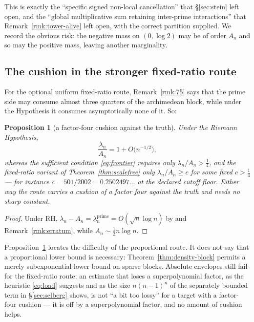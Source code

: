 \documentclass[11pt]{amsart}
\newtheorem{proposition}[theorem]{Proposition}
\theoremstyle{definition}
\theoremstyle{remark}
\theoremstyle{definition}
\begin{document}
This is exactly the ``specific signed non-local cancellation'' that \S\ref{sec:stein} left open, and
the ``global multiplicative sum retaining inter-prime interactions'' that
Remark~\ref{rmk:tower-alive} left open, with the correct partition supplied. We record the obvious
risk: the negative mass on $(0,\log2)$ may be of order $A_n$ and so may the positive mass, leaving
another marginality.

\subsection{The cushion in the stronger fixed-ratio route}\label{sec:cushion}

For the optional uniform fixed-ratio route, Remark~\ref{rmk:75} says that the prime side may
consume almost three quarters of the archimedean block, while under the Hypothesis it consumes
asymptotically none of it. So:

\begin{proposition}[a factor-four cushion against the truth]\label{prop:cushion}
Under the Riemann Hypothesis,
\[
   \frac{\lambda_n}{A_n}=1+O\bigl(n^{-1/2}\bigr),
\]
whereas the sufficient condition \eqref{eq:frontier} requires only $\lambda_n/A_n>\tfrac14$, and
the fixed-ratio variant of Theorem~\ref{thm:scalefree} only $\lambda_n/A_n\ge c$ for some fixed
$c>\tfrac14$ --- for instance $c=501/2002=0.2502497\ldots$ at the declared cutoff floor. Either
way the route carries a cushion of a factor four against the truth and needs no sharp constant.
\end{proposition}

\begin{proof}
Under RH, $\lambda_n-A_n=\lambda_n^{\mathrm{prime}}=O(\sqrt n\log n)$ by \cite{Lagarias2007} and
Remark~\ref{rmk:erratum}, while $A_n\sim\tfrac12n\log n$.
\end{proof}

Proposition~\ref{prop:cushion} locates the difficulty of the proportional route. It does not say
that a proportional lower bound is necessary: Theorem~\ref{thm:density-block} permits a merely
subexponential lower bound on sparse blocks. Absolute envelopes still fail for the fixed-ratio route:
an estimate that loses a superpolynomial factor, as the heuristic \eqref{eq:load} suggests and as
the size $n(n-1)^n$ of the separately bounded term in \S\ref{sec:selberg} shows, is not
``a bit too lossy'' for a target with a factor-four cushion --- it is off by a superpolynomial
factor, and no amount of cushion helps.
\end{document}
